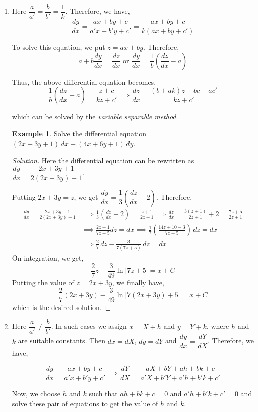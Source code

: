 \documentclass{book}
\theoremstyle{definition}
\newtheorem{example}{Example}[section]
\newenvironment{solution}
    {\begin{proof}[Solution]}
    {\end{proof}}
\begin{document}
\begin{enumerate}
\item Here $\dfrac{a}{a'}=\dfrac{b}{b'}=\dfrac{1}{k}$. Therefore, we have,
\[
\frac{dy}{dx}=\frac{ax+by+c}{a'x+b'y+c'}=\frac{ax+by+c}{k(ax+by+c')}
\]

To solve this equation, we put $z=ax+by$. Therefore,
\[
a+b\frac{dy}{dx}=\frac{dz}{dx} \text{ or } \frac{dy}{dx}=\frac{1}{b}\left(\frac{dz}{dx}-a\right)
\]

Thus, the above differential equation becomes, 
\[
\frac{1}{b}\left(\frac{dz}{dx}-a\right)=\frac{z+c}{kz+c'} \implies \frac{dz}{dx}=\frac{(b+ak)z+bc+ac'}{kz+c'}
\]

which can be solved by the \textit{variable separable method}.

\begin{example}
Solve the differential equation $(2x+3y+1)\,dx-(4x+6y+1)\,dy$.
\end{example}

\begin{solution}
Here the differential equation can be rewritten as $\dfrac{dy}{dx}=\dfrac{2x+3y+1}{2(2x+3y)+1}$.

Putting $2x+3y=z$, we get $\dfrac{dy}{dx}=\dfrac{1}{3}(\dfrac{dz}{dx}-2)$. Therefore,
\begin{align*}
\frac{dy}{dx}=\frac{2x+3y+1}{2(2x+3y)+1} &\implies \frac{1}{3}(\frac{dz}{dx}-2)=\frac{z+1}{2z+1} \implies \frac{dz}{dx}=\frac{3(z+1)}{2z+1}+2=\frac{7z+5}{2z+1} \\
&\implies \frac{2z+1}{7z+5}dz=dx \implies \frac{1}{7}\left(\frac{14z+10-3}{7z+5}\right)\,dz=dx \\
&\implies \frac{2}{7}\,dz-\frac{3}{7(7z+5)}\,dz=dx
\end{align*}
On integration, we get,
\[
\frac{2}{7}z-\frac{3}{49}\ln |7z+5|=x+C
\]
Putting the value of $z=2x+3y$, we finally have,
\[
\frac{2}{7}(2x+3y)-\frac{3}{49}\ln |7(2x+3y)+5|=x+C
\]
which is the desired solution.
\end{solution} 




\item Here $\dfrac{a}{a'}\neq\dfrac{b}{b'}$. In such cases we assign $x=X+h$ and $y=Y+k$, where $h$ and $k$ are suitable constants. Then $dx=dX$, $dy=dY$ and $\dfrac{dy}{dx}=\dfrac{dY}{dX}$. Therefore, we have,

\[
\frac{dy}{dx}=\frac{ax+by+c}{a'x+b'y+c'} \implies \frac{dY}{dX}=\frac{aX+bY+ah+bk+c}{a'X+b'Y+a'h+b'k+c'}
\]

Now, we choose $h$ and $k$ such that $ah+bk+c=0$ and $a'h+b'k+c'=0$ and solve these pair of equations to get the value of  $h$ and $k$. 


\end{enumerate}
\end{document}
